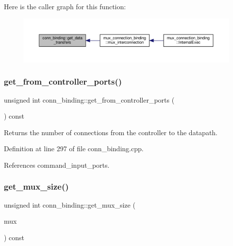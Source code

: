 Here is the caller graph for this function\+:
\nopagebreak
\begin{figure}[H]
\begin{center}
\leavevmode
\includegraphics[width=350pt]{d2/db1/classconn__binding_a3d80a579f44ae487ed5419b560ad5d26_icgraph}
\end{center}
\end{figure}
\mbox{\label{classconn__binding_a1e5c6ff971f65ab857d0c599b97e9e88}} 
\subsubsection{\texorpdfstring{get\+\_\+from\+\_\+controller\+\_\+ports()}{get\_from\_controller\_ports()}}
{\footnotesize\ttfamily unsigned int conn\+\_\+binding\+::get\+\_\+from\+\_\+controller\+\_\+ports (\begin{DoxyParamCaption}{ }\end{DoxyParamCaption}) const}



Returns the number of connections from the controller to the datapath. 



Definition at line 297 of file conn\+\_\+binding.\+cpp.



References command\+\_\+input\+\_\+ports.

\mbox{\label{classconn__binding_a81141f5a9d7905a26c53d13123c286b6}} 
\subsubsection{\texorpdfstring{get\+\_\+mux\+\_\+size()}{get\_mux\_size()}}
{\footnotesize\ttfamily unsigned int conn\+\_\+binding\+::get\+\_\+mux\+\_\+size (\begin{DoxyParamCaption}\item[{const \hyperlink{generic__obj_8hpp_acb533b2ef8e0fe72e09a04d20904ca81}{generic\+\_\+obj\+Ref}}]{mux }\end{DoxyParamCaption}) const\hspace{0.3cm}{\ttfamily [protected]}}



